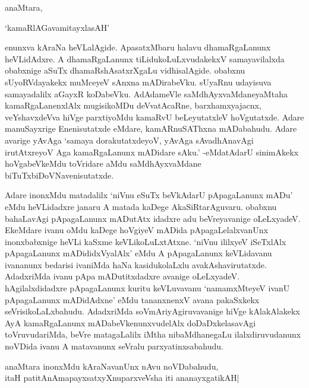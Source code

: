 anaMtara,

\begin{shloka}
`kamaRlAGavamitayxlasAH'
\end{shloka}

\noindent enunxva kAraNa heVLalAgide. ApasatxMbaru halavu dhamaRgaLanunx heVLidAdxre. A dhamaRgaLanunx tiLidukoLuLxvudakekxV samayavilalxda obabxnige aSuTx dhamaRshAsatxrXgaLu vidhisalAgide. obabxnu sUyoRVdayakekx muMceyeV sAnxna mADirabeVku. sUyaRnu udayisuva samayadalilx aGayxR koDabeVku. AdAdameVle saMdhAyxvaMdaneyaMtaha kamaRgaLanenxlAlx mugisikoMDu deVvatAcaRne, barxhamxyajacnx, veYshavxdeVva hiVge parxtiyoMdu kamaRvU beLeyutatxleV hoVgutatxde. Adare manuSayxrige Enenisutatxde eMdare, kamARnuSAThxna mADabahudu. Adare avarige yAvAga `samaya dorakutatxdeyoV, yAvAga sAvadhAnavAgi irutAtxreyoV Aga kamaRgaLanunx mADidare sAku.' -eMdatAdarU sinimAkekx hoVgabeVkeMdu toVridare aMdu saMdhAyxvaMdane biTuTxbiDoVNavenisutatxde.

Adare inonxMdu matadalilx `niVnu eSuTx beVkAdarU pApagaLanunx mADu' eMdu heVLidadxre janaru A matada kaDege AkaSiRtarAguvaru. obabxnu bahaLavAgi pApagaLanunx mADutAtx idadxre adu beVreyavanige oLeLxyadeV. EkeMdare ivanu oMdu kaDege hoVgiyeV mADida pApagaLelalxvanUnx inonxbabxnige heVLi kaSxme keVLikoLuLxtAtxne. `niVnu ililxyeV iSeTxlAlx pApagaLanunx mADididxVyalAlx' eMdu A pApagaLanunx keVLidavanu ivananunx bedarisi ivaniMda haNa kasidukolaLxlu avakAshavirutatxde. AdadxriMda ivanu pApa mADutitxdadxre avanige oLeLxyadeV. hAgilalxdidadxre pApagaLanunx kuritu keVLuvavanu `namamxMteyeV ivanU pApagaLanunx mADidAdxne' eMdu tananxnenxV avana pakaSxkekx seVrisikoLaLxbahudu. AdadxriMda soVmAriyAgiruvavanige hiVge kAlakAlakekx AyA kamaRgaLanunx mADabeVkenunxvudelAlx doDaDxkelasavAgi toVruvudariMda, beVre matagaLalilx iMtha nibaMdhanegaLu ilalxdiruvudanunx noVDida ivanu A matavanunx seVralu parxyatinxsabahudu.

\begin{center}
anaMtara inonxMdu kAraNavanUnx nAvu noVDabahudu,\\
itaH patitAnAmapayxsatxyXnuparxveVsha iti ananayxgatikAH|
\end{center} 

